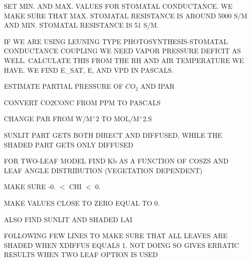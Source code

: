 S\+E\+T M\+I\+N. A\+N\+D M\+A\+X. V\+A\+L\+U\+E\+S F\+O\+R S\+T\+O\+M\+A\+T\+A\+L C\+O\+N\+D\+U\+C\+T\+A\+N\+C\+E. W\+E M\+A\+K\+E S\+U\+R\+E T\+H\+A\+T M\+A\+X. S\+T\+O\+M\+A\+T\+A\+L R\+E\+S\+I\+S\+T\+A\+N\+C\+E I\+S A\+R\+O\+U\+N\+D 5000 S/\+M A\+N\+D M\+I\+N. S\+T\+O\+M\+A\+T\+A\+L R\+E\+S\+I\+S\+T\+A\+N\+C\+E I\+S 51 S/\+M.

I\+F W\+E A\+R\+E U\+S\+I\+N\+G L\+E\+U\+N\+I\+N\+G T\+Y\+P\+E P\+H\+O\+T\+O\+S\+Y\+N\+T\+H\+E\+S\+I\+S-\/\+S\+T\+O\+M\+A\+T\+A\+L C\+O\+N\+D\+U\+C\+T\+A\+N\+C\+E C\+O\+U\+P\+L\+I\+N\+G W\+E N\+E\+E\+D V\+A\+P\+O\+R P\+R\+E\+S\+S\+U\+R\+E D\+E\+F\+I\+C\+I\+T A\+S W\+E\+L\+L. C\+A\+L\+C\+U\+L\+A\+T\+E T\+H\+I\+S F\+R\+O\+M T\+H\+E R\+H A\+N\+D A\+I\+R T\+E\+M\+P\+E\+R\+A\+T\+U\+R\+E W\+E H\+A\+V\+E. W\+E F\+I\+N\+D E\+\_\+\+S\+A\+T, E, A\+N\+D V\+P\+D I\+N P\+A\+S\+C\+A\+L\+S.

E\+S\+T\+I\+M\+A\+T\+E P\+A\+R\+T\+I\+A\+L P\+R\+E\+S\+S\+U\+R\+E O\+F $CO_2$ A\+N\+D I\+P\+A\+R

C\+O\+N\+V\+E\+R\+T C\+O2\+C\+O\+N\+C F\+R\+O\+M P\+P\+M T\+O P\+A\+S\+C\+A\+L\+S

C\+H\+A\+N\+G\+E P\+A\+R F\+R\+O\+M W/\+M$^\wedge$2 T\+O M\+O\+L/\+M$^\wedge$2.S

S\+U\+N\+L\+I\+T P\+A\+R\+T G\+E\+T\+S B\+O\+T\+H D\+I\+R\+E\+C\+T A\+N\+D D\+I\+F\+F\+U\+S\+E\+D, W\+H\+I\+L\+E T\+H\+E S\+H\+A\+D\+E\+D P\+A\+R\+T G\+E\+T\+S O\+N\+L\+Y D\+I\+F\+F\+U\+S\+E\+D

F\+O\+R T\+W\+O-\/\+L\+E\+A\+F M\+O\+D\+E\+L F\+I\+N\+D Kb A\+S A F\+U\+N\+C\+T\+I\+O\+N O\+F C\+O\+S\+Z\+S A\+N\+D L\+E\+A\+F A\+N\+G\+L\+E D\+I\+S\+T\+R\+I\+B\+U\+T\+I\+O\+N (V\+E\+G\+E\+T\+A\+T\+I\+O\+N D\+E\+P\+E\+N\+D\+E\+N\+T)

M\+A\+K\+E S\+U\+R\+E -\/0. $<$ C\+H\+I $<$ 0.

M\+A\+K\+E V\+A\+L\+U\+E\+S C\+L\+O\+S\+E T\+O Z\+E\+R\+O E\+Q\+U\+A\+L T\+O 0.

A\+L\+S\+O F\+I\+N\+D S\+U\+N\+L\+I\+T A\+N\+D S\+H\+A\+D\+E\+D L\+A\+I

F\+O\+L\+L\+O\+W\+I\+N\+G F\+E\+W L\+I\+N\+E\+S T\+O M\+A\+K\+E S\+U\+R\+E T\+H\+A\+T A\+L\+L L\+E\+A\+V\+E\+S A\+R\+E S\+H\+A\+D\+E\+D W\+H\+E\+N X\+D\+I\+F\+F\+U\+S E\+Q\+U\+A\+L\+S 1. N\+O\+T D\+O\+I\+N\+G S\+O G\+I\+V\+E\+S E\+R\+R\+A\+T\+I\+C R\+E\+S\+U\+L\+T\+S W\+H\+E\+N T\+W\+O L\+E\+A\+F O\+P\+T\+I\+O\+N I\+S U\+S\+E\+D

